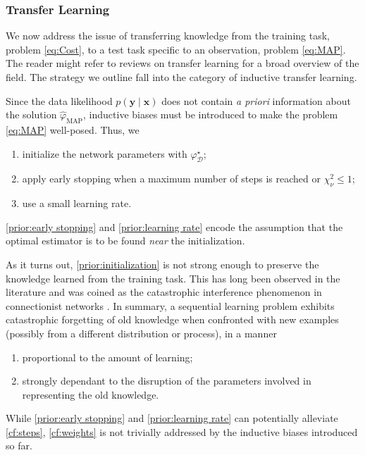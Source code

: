 \subsubsection{Transfer Learning}
We now address the issue of transferring knowledge from the training task, problem \eqref{eq:Cost}, 
to a test task specific to an observation, problem \eqref{eq:MAP}.
The reader might refer to reviews on transfer learning \citep{Pan2010,Zhuang2019} 
for a broad overview of the field. The strategy we outline fall into 
the category of inductive transfer learning.

Since the data likelihood $p(\mathbf{y} \mid \mathbf{x})$ 
does not contain \textit{a priori} information 
about the solution $\hat{\varphi}_{\mathrm{MAP}}$,
inductive biases must be introduced to make 
the problem \eqref{eq:MAP} well-posed. Thus, we
\begin{enumerate}[label=(\subscript{\mathcal{H}}{{\arabic*}})]
        \item \label{prior:initialization} initialize the network parameters with $\varphi_{\mathcal{D}}^{\star}$; 
        \item \label{prior:early stopping} apply early stopping when a maximum number of steps is reached or 
                $\chi^2_\nu \leq 1$;
        \item \label{prior:learning rate} use a small learning rate.
\end{enumerate}
\ref{prior:early stopping} and \ref{prior:learning rate} encode the assumption 
that the optimal estimator is to be found \textit{near} the initialization.

As it turns out, \ref{prior:initialization} is not strong 
enough to preserve the knowledge learned from the training task. 
This has long been observed in the literature and was coined as the 
catastrophic interference phenomenon in 
connectionist networks \citep{McCloskey1989,Ratcliff1990}.
In summary, a sequential learning problem exhibits catastrophic 
forgetting of old knowledge when confronted with new examples (possibly 
from a different distribution or process), in a manner 
\begin{enumerate}[label=(\subscript{\mathrm{CF}}{{\arabic*}})]
        \item \label{cf:steps} proportional to the amount of learning;
        \item \label{cf:weights} strongly dependant to the disruption of the parameters
                involved in representing the old knowledge.
\end{enumerate}
While \ref{prior:early stopping} and \ref{prior:learning rate} can 
potentially alleviate \ref{cf:steps}, \ref{cf:weights} is not 
trivially addressed by the inductive biases introduced so far.

